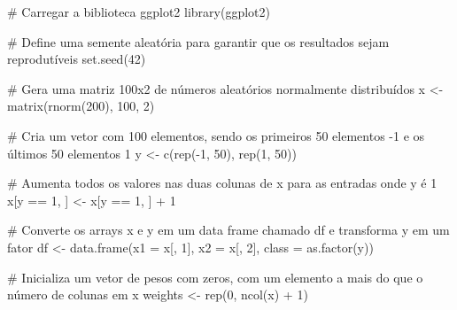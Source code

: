\documentclass[
  a4paperpaper,
]{article}
\newenvironment{Shaded}{\begin{snugshade}}{\end{snugshade}}
\newcommand{\AttributeTok}[1]{\textcolor[rgb]{0.40,0.45,0.13}{#1}}
\newcommand{\CommentTok}[1]{\textcolor[rgb]{0.37,0.37,0.37}{#1}}
\newcommand{\DecValTok}[1]{\textcolor[rgb]{0.68,0.00,0.00}{#1}}
\newcommand{\FunctionTok}[1]{\textcolor[rgb]{0.28,0.35,0.67}{#1}}
\newcommand{\NormalTok}[1]{\textcolor[rgb]{0.00,0.23,0.31}{#1}}
\newcommand{\OtherTok}[1]{\textcolor[rgb]{0.00,0.23,0.31}{#1}}
\newcommand{\SpecialCharTok}[1]{\textcolor[rgb]{0.37,0.37,0.37}{#1}}
\begin{document}
\begin{Shaded}
\begin{Highlighting}[]
\CommentTok{\# Carregar a biblioteca ggplot2}
\FunctionTok{library}\NormalTok{(ggplot2)}

\CommentTok{\# Define uma semente aleatória para garantir que os resultados sejam reprodutíveis}
\FunctionTok{set.seed}\NormalTok{(}\DecValTok{42}\NormalTok{)}

\CommentTok{\# Gera uma matriz 100x2 de números aleatórios normalmente distribuídos}
\NormalTok{x }\OtherTok{\textless{}{-}} \FunctionTok{matrix}\NormalTok{(}\FunctionTok{rnorm}\NormalTok{(}\DecValTok{200}\NormalTok{), }\DecValTok{100}\NormalTok{, }\DecValTok{2}\NormalTok{)}

\CommentTok{\# Cria um vetor com 100 elementos, sendo os primeiros 50 elementos {-}1 e os últimos 50 elementos 1}
\NormalTok{y }\OtherTok{\textless{}{-}} \FunctionTok{c}\NormalTok{(}\FunctionTok{rep}\NormalTok{(}\SpecialCharTok{{-}}\DecValTok{1}\NormalTok{, }\DecValTok{50}\NormalTok{), }\FunctionTok{rep}\NormalTok{(}\DecValTok{1}\NormalTok{, }\DecValTok{50}\NormalTok{))}

\CommentTok{\# Aumenta todos os valores nas duas colunas de \textquotesingle{}x\textquotesingle{} para as entradas onde \textquotesingle{}y\textquotesingle{} é 1}
\NormalTok{x[y }\SpecialCharTok{==} \DecValTok{1}\NormalTok{, ] }\OtherTok{\textless{}{-}}\NormalTok{ x[y }\SpecialCharTok{==} \DecValTok{1}\NormalTok{, ] }\SpecialCharTok{+} \DecValTok{1}

\CommentTok{\# Converte os arrays \textquotesingle{}x\textquotesingle{} e \textquotesingle{}y\textquotesingle{} em um data frame chamado \textquotesingle{}df\textquotesingle{} e transforma \textquotesingle{}y\textquotesingle{} em um fator}
\NormalTok{df }\OtherTok{\textless{}{-}} \FunctionTok{data.frame}\NormalTok{(}\AttributeTok{x1 =}\NormalTok{ x[, }\DecValTok{1}\NormalTok{], }\AttributeTok{x2 =}\NormalTok{ x[, }\DecValTok{2}\NormalTok{], }\AttributeTok{class =} \FunctionTok{as.factor}\NormalTok{(y))}

\CommentTok{\# Inicializa um vetor de pesos com zeros, com um elemento a mais do que o número de colunas em \textquotesingle{}x\textquotesingle{}}
\NormalTok{weights }\OtherTok{\textless{}{-}} \FunctionTok{rep}\NormalTok{(}\DecValTok{0}\NormalTok{, }\FunctionTok{ncol}\NormalTok{(x) }\SpecialCharTok{+} \DecValTok{1}\NormalTok{)}


\end{Highlighting}
\end{Shaded}
\end{document}
